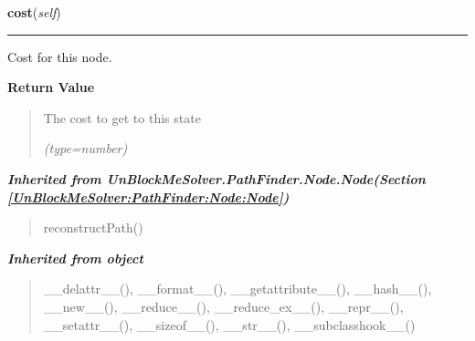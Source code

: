     \label{UnBlockMeSolver:PathFinder:AStarNode:AStarNode:cost}

    \vspace{0.5ex}

\hspace{.8\funcindent}\begin{boxedminipage}{\funcwidth}

    \raggedright \textbf{cost}(\textit{self})

    \vspace{-1.5ex}

    \rule{\textwidth}{0.5\fboxrule}
\setlength{\parskip}{2ex}
    Cost for this node.

\setlength{\parskip}{1ex}
      \textbf{Return Value}
    \vspace{-1ex}

      \begin{quote}
      The cost to get to this state

      {\it (type=number)}

      \end{quote}

    \end{boxedminipage}


\large{\textbf{\textit{Inherited from UnBlockMeSolver.PathFinder.Node.Node\textit{(Section \ref{UnBlockMeSolver:PathFinder:Node:Node})}}}}

\begin{quote}
reconstructPath()
\end{quote}

\large{\textbf{\textit{Inherited from object}}}

\begin{quote}
\_\_delattr\_\_(), \_\_format\_\_(), \_\_getattribute\_\_(), \_\_hash\_\_(), \_\_new\_\_(), \_\_reduce\_\_(), \_\_reduce\_ex\_\_(), \_\_repr\_\_(), \_\_setattr\_\_(), \_\_sizeof\_\_(), \_\_str\_\_(), \_\_subclasshook\_\_()
\end{quote}


